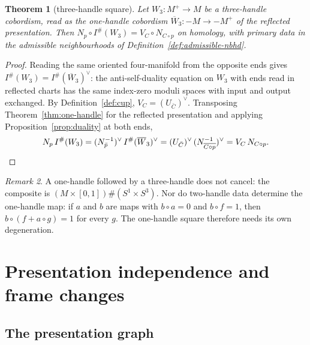 \documentclass[11pt]{amsart}
\newtheorem{theorem}{Theorem}[section]
\theoremstyle{definition}
\theoremstyle{remark}
\newtheorem{remark}[theorem]{Remark}
\theoremstyle{plain}
\numberwithin{equation}{section}
\newcommand{\Ish}{I^{\#}}
\begin{document}
\begin{theorem}[three-handle square]\label{thm:three-handle}
Let $W_3\colon M^+\to M$ be a three-handle cobordism, read as the one-handle cobordism
$\overline W_3\colon-M\to-M^+$ of the reflected presentation. Then
$N_p\circ\Ish(W_3)=V_C\circ N_{C\circ p}$ on homology, with primary data in the admissible
neighbourhoods of Definition~\ref{def:admissible-nbhd}.
\end{theorem}

\begin{proof}
Reading the same oriented four-manifold from the opposite ends gives
$\Ish(W_3)=\Ish(\overline W_3)^\vee$: the anti-self-duality equation on $W_3$ with ends
read in reflected charts has the same index-zero moduli spaces with input and
output exchanged. By Definition~\ref{def:cup}, $V_C=(U_{\bar C})^\vee$. Transposing
Theorem~\ref{thm:one-handle} for the reflected presentation and applying
Proposition~\ref{prop:duality} at both ends,
\[
N_p\,\Ish(W_3)=(N_{\bar p}^{-1})^\vee\,\Ish(\overline W_3)^\vee
=(U_{\bar C})^\vee\,(N_{\overline{C\circ p}}^{-1})^\vee=V_C\,N_{C\circ p}. \qedhere
\]
\end{proof}

\begin{remark}
A one-handle followed by a three-handle does not cancel: the composite is
$(M\times[0,1])\#(S^1\times S^3)$. Nor do two-handle data determine the
one-handle map: if $a$ and $b$ are maps with $b\circ a=0$ and $b\circ f=1$, then
$b\circ(f+a\circ g)=1$ for every $g$. The one-handle square therefore needs its
own degeneration.
\end{remark}

\section{Presentation independence and frame changes}\label{sec:presentations}

\subsection{The presentation graph}
\end{document}
